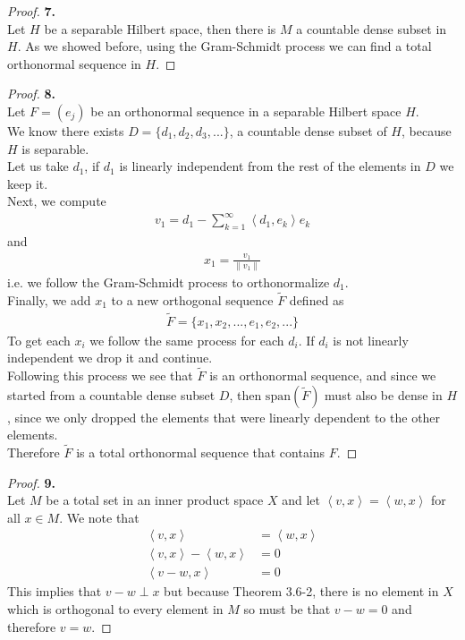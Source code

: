 \documentclass[11pt]{article}
\newcommand{\inprd}[1]{\left\langle{#1}\right\rangle}
\newcommand{\Span}[1]{\text{span}(#1)}
\theoremstyle{definition}
\begin{document}
\cleardoublepage
\begin{proof}{\textbf{7.}}\\
Let $H$ be a separable Hilbert space, then there is $M$ a countable dense
subset in $H$. As we showed before, using the Gram-Schmidt process we can find
a total orthonormal sequence in $H$.
\end{proof}

\cleardoublepage
\begin{proof}{\textbf{8.}}\\
Let $F = (e_j)$ be an orthonormal sequence in a separable Hilbert space $H$.\\
We know there exists $D = \{d_1, d_2, d_3, ...\}$, a countable dense subset
of $H$, because $H$ is separable.\\
Let us take $d_1$, if $d_1$ is linearly independent from the rest of the
elements in $D$ we keep it.\\
Next, we compute
\begin{align*}
    v_1 = d_1 - \sum_{k=1}^{\infty}\inprd{d_1, e_k}e_k
\end{align*}
and
\begin{align*}
    x_1 = \frac{v_1}{\|v_1\|}
\end{align*}
i.e. we follow the Gram-Schmidt process to orthonormalize $d_1$.\\
Finally, we add $x_1$ to a new orthogonal sequence $\tilde{F}$ defined as
\begin{align*}
    \tilde{F} = \{x_1, x_2, ...,  e_1, e_2, ...\}
\end{align*}
To get each $x_i$ we follow the same process for each $d_i$.
If $d_i$ is not linearly independent we drop it and continue.\\
Following this process we see that $\tilde{F}$ is an orthonormal sequence, 
and since we started from a countable dense subset $D$, then $\Span{\tilde{F}}$
must also be dense in $H$, since we only dropped the elements that were
linearly dependent to the other elements.\\
Therefore $\tilde{F}$ is a total orthonormal sequence that contains $F$.
\end{proof}

\cleardoublepage
\begin{proof}{\textbf{9.}}\\
Let $M$ be a total set in an inner product space $X$ and
let $\inprd{v,x} = \inprd{w,x}$ for all $x \in M$. We note that
\begin{align*}
    \inprd{v,x} &= \inprd{w,x}\\
    \inprd{v,x} - \inprd{w,x} &= 0\\
    \inprd{v - w, x} &= 0
\end{align*}
This implies that $v - w\perp x$ but because Theorem 3.6-2, there is no element
in $X$ which is orthogonal to every element in $M$ so must be that $v -w = 0$
and therefore $v = w$.
\end{proof}
\end{document}
